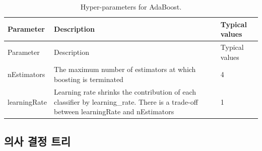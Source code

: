 \documentclass[10.5pt]{book}
\theoremstyle{definition}
\theoremstyle{definition}
\theoremstyle{definition}
\theoremstyle{remark}
\begin{document}
\begin{longtable}[]{@{}lll@{}}
\caption{\label{tab:adaBoostParameters} Hyper-parameters for
AdaBoost.}\tabularnewline
\toprule
\begin{minipage}[b]{0.13\columnwidth}\raggedright\strut
Parameter\strut
\end{minipage} & \begin{minipage}[b]{0.16\columnwidth}\raggedright\strut
Description\strut
\end{minipage} & \begin{minipage}[b]{0.20\columnwidth}\raggedright\strut
Typical values\strut
\end{minipage}\tabularnewline
\midrule
\endfirsthead
\toprule
\begin{minipage}[b]{0.13\columnwidth}\raggedright\strut
Parameter\strut
\end{minipage} & \begin{minipage}[b]{0.16\columnwidth}\raggedright\strut
Description\strut
\end{minipage} & \begin{minipage}[b]{0.20\columnwidth}\raggedright\strut
Typical values\strut
\end{minipage}\tabularnewline
\midrule
\endhead
\begin{minipage}[t]{0.13\columnwidth}\raggedright\strut
nEstimators\strut
\end{minipage} & \begin{minipage}[t]{0.16\columnwidth}\raggedright\strut
The maximum number of estimators at which boosting is terminated\strut
\end{minipage} & \begin{minipage}[t]{0.20\columnwidth}\raggedright\strut
4\strut
\end{minipage}\tabularnewline
\begin{minipage}[t]{0.13\columnwidth}\raggedright\strut
learningRate\strut
\end{minipage} & \begin{minipage}[t]{0.16\columnwidth}\raggedright\strut
Learning rate shrinks the contribution of each classifier by
learning\_rate. There is a trade-off between learningRate and
nEstimators\strut
\end{minipage} & \begin{minipage}[t]{0.20\columnwidth}\raggedright\strut
1\strut
\end{minipage}\tabularnewline
\bottomrule
\end{longtable}

\subsection{의사 결정 트리}\label{--}
\end{document}
